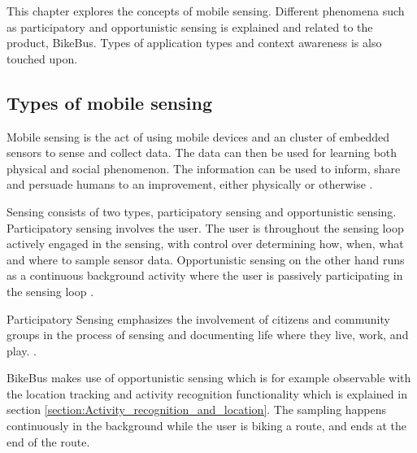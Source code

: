 
\label{section:Mobile_Sensing}

This chapter explores the concepts of mobile sensing. Different phenomena such as participatory and opportunistic sensing is explained and related to the product, BikeBus. Types of application types and context awareness is also touched upon.

\subsection{Types of mobile sensing}  
\label{section:Mobile_Sensing_Types_of_mobile_sensing}
Mobile sensing is the act of using mobile devices and an cluster of embedded sensors to sense and collect data. The data can then be used for learning both physical and social phenomenon. The information can be used to inform, share and persuade humans to an improvement, either physically or otherwise \cite{Kjaergaard:2015:AQT:2737182.2737196}. 


Sensing consists of two types, participatory sensing and opportunistic sensing. Participatory sensing involves the user. The user is throughout the sensing loop actively engaged in the sensing, with control over determining how, when, what and where to sample sensor data. Opportunistic sensing on the other hand runs as a continuous background activity where the user is passively participating in the sensing loop \cite{Lane:2010:SMP:1866991.1867010}.

\begin{defi}
Participatory  Sensing  emphasizes  the  involvement  of  citizens  and  community  groups  in  the 
process  of  sensing  and  documenting  life  where  they  live,  work,  and  play. \cite{Goldman2009}. 
\end{defi}

BikeBus makes use of opportunistic sensing which is for example observable with the location tracking and activity recognition functionality which is explained in section \ref{section:Activity_recognition_and_location}. The sampling happens continuously in the background while the user is biking a route, and ends at the end of the route.



